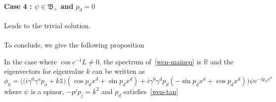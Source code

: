 \paragraph{Case 4 : $\psi \in \mathfrak{B}_+$ and $p_d = 0$}
Leads to the trivial solution. \\\\
To conclude, we give the following proposition
\begin{proposition}
In the case where $\cos c^{-1}L \neq 0$,
the spectrum of~\cref{wen-maineq} is $\mathbb{R}$ 
and the eigenvectors for eigenvalue $k$ can be written as 
\begin{equation*}
\phi_k = \Big(\big(i\gamma^0\gamma^a p_a+k\mathbb{1}\big)(\cos p_d x^d + \sin p_d x^d) +
i\gamma^0\gamma^d p_d(-\sin p_d x^d + \cos p_d x^d)\Big) \psi e^{-ip_a x^a}
\end{equation*}
where $\psi$ is a spinor, $-p^jp_j = k^2$ and $p_d$ satisfies~\cref{wen-tan}
\end{proposition}




